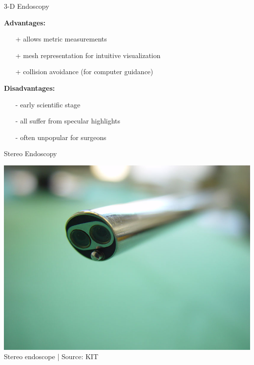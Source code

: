 \begin{frame}{3-D Endoscopy}

	\textbf{Advantages:}
	\begin{itemize}
		\item[+] allows metric measurements
		\item[+] mesh representation for intuitive visualization
		\item[+] collision avoidance (for computer guidance)
	\end{itemize}
	\vspace{1em}
	\textbf{Disadvantages:}
	\begin{itemize}
		\item[-] early scientific stage
		\item[-] all suffer from specular highlights
		\item[-] often unpopular for surgeons
	\end{itemize}

\end{frame}



\begin{frame}{Stereo Endoscopy}

	\begin{center}
		\includegraphics[height=.8\textheight ]{images/stereo}\\
		\scriptsize Stereo endoscope | Source: KIT
	\end{center}

\end{frame}



